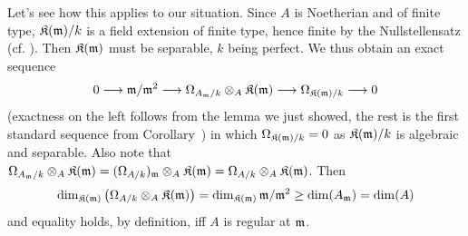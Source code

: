 \documentclass[a4paper,parskip=half,numbers=enddot, DIV=12]{scrreprt}
\begin{document}
Let's see how this applies to our situation. Since $A$ is Noetherian and of finite type, $\mathfrak{K}(\mathfrak{m})/k$ is a field extension of finite type, hence finite by the Nullstellensatz (cf. \cite[Theorem~4]{alg1}). Then $\mathfrak{K}(\mathfrak{m})$ must be separable, $k$ being perfect. We thus obtain an exact sequence
\begin{align*}
	0\morphism\mm/\mm^2\morphism\Omega_{A_\mm/k}\otimes_A\KK(\mm)\morphism\Omega_{\KK(\mm)/k}\morphism 0
\end{align*}
(exactness on the left follows from the lemma we just showed, the rest is the first standard sequence from Corollary~) in which $\Omega_{\mathfrak{K}(\mathfrak{m})/k}=0$ as $\mathfrak{K}(\mathfrak{m})/k$ is algebraic and separable. Also note that $\Omega_{A_{\mathfrak{m}}/k}\otimes_A\mathfrak{K}(\mathfrak{m})=(\Omega_{A/k})_{\mathfrak{m}}\otimes_A\mathfrak{K}(\mathfrak{m})=\Omega_{A/k}\otimes_A\mathfrak{K}(\mathfrak{m})$. Then
\begin{align*}
	\dim_{\mathfrak{K}(\mathfrak{m})}\left(\Omega_{A/k}\otimes_A\mathfrak{K}(\mathfrak{m})\right)=\dim_{\mathfrak{K}(\mathfrak{m})}\mathfrak{m}/\mathfrak{m}^2\geq\dim (A_{\mathfrak{m}})=\dim (A)
\end{align*}
and equality holds, by definition, iff $A$ is regular at $\mathfrak{m}$.
\end{document}
